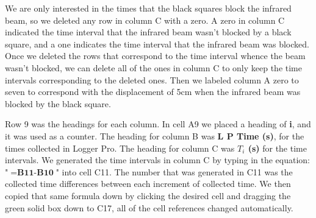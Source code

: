 \documentclass[aps,letterpaper,11pt]{revtex4}
\begin{document}
We are only interested in the times that the black squares block the infrared beam, so we deleted any row in column C with a zero. A zero in column C indicated the time interval that the infrared beam wasn't blocked by a black square, and a one indicates the time interval that the infrared beam was blocked. Once we deleted the rows that correspond to the time interval whence the beam wasn't blocked, we can delete all of the ones in column C to only keep the time intervals corresponding to the deleted ones. Then we labeled column A zero to seven to correspond with the displacement of 5cm when the infrared beam was blocked by the black square. 

Row 9 was the headings for each column. In cell A9 we placed a heading of \textbf{i}, and it was used as a counter. The heading for column B was \textbf{L P Time (s)}, for the times collected in Logger Pro. The heading for column C was \textbf{$T_i$ (s)} for the time intervals. We generated the time intervals in column C by typing in the equation: "$= \textbf{B11-B10}$" into cell C11. The number that was generated in C11 was the collected time differences between each increment of collected time. We then copied that same formula down by clicking the desired cell and dragging the green solid box down to C17, all of the cell references changed automatically. 
\end{document}
